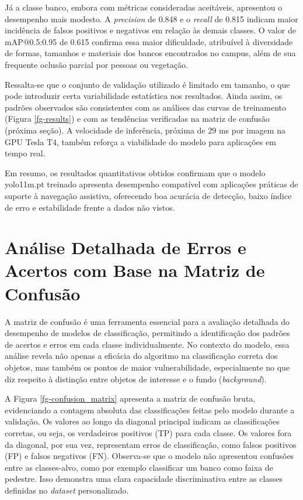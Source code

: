 Já a classe banco, embora com métricas consideradas aceitáveis, apresentou o desempenho mais modesto. A \textit{precision} de 0.848 e o \textit{recall} de 0.815 indicam maior incidência de falsos positivos e negativos em relação às demais classes. O valor de mAP@0.5:0.95 de 0.615 confirma essa maior dificuldade, atribuível à diversidade de formas, tamanhos e materiais dos bancos encontrados no campus, além de sua frequente oclusão parcial por pessoas ou vegetação.

Ressalta-se que o conjunto de validação utilizado é limitado em tamanho, o que pode introduzir certa variabilidade estatística nos resultados. Ainda assim, os padrões observados são consistentes com as análises das curvas de treinamento (Figura \ref{fg-results}) e com as tendências verificadas na matriz de confusão (próxima seção). A velocidade de inferência, próxima de 29 ms por imagem na GPU Tesla T4, também reforça a viabilidade do modelo para aplicações em tempo real.

Em resumo, os resultados quantitativos obtidos confirmam que o modelo yolo11m.pt treinado apresenta desempenho compatível com aplicações práticas de suporte à navegação assistiva, oferecendo boa acurácia de detecção, baixo índice de erro e estabilidade frente a dados não vistos.

\section{Análise Detalhada de Erros e Acertos com Base na Matriz de Confusão}

A matriz de confusão é uma ferramenta essencial para a avaliação detalhada do desempenho de modelos de classificação, permitindo a identificação dos padrões de acertos e erros em cada classe individualmente. No contexto do modelo, essa análise revela não apenas a eficácia do algoritmo na classificação correta dos objetos, mas também os pontos de maior vulnerabilidade, especialmente no que diz respeito à distinção entre objetos de interesse e o fundo (\textit{background}).

A Figura \ref{fg-confusion_matrix} apresenta a matriz de confusão bruta, evidenciando a contagem absoluta das classificações feitas pelo modelo durante a validação. Os valores ao longo da diagonal principal indicam as classificações corretas, ou seja, os verdadeiros positivos (TP) para cada classe. Os valores fora da diagonal, por sua vez, representam erros de classificação, como falsos positivos (FP) e falsos negativos (FN). Observa-se que o modelo não apresentou confusões entre as classes-alvo, como por exemplo classificar um banco como faixa de pedestre. Isso demonstra uma clara capacidade discriminativa entre as classes definidas no \textit{dataset} personalizado.

